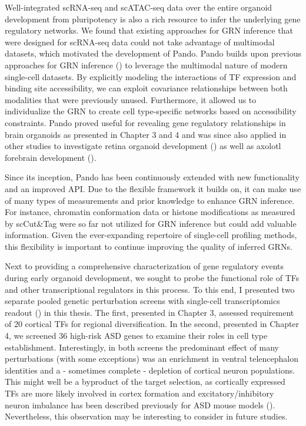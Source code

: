 Well-integrated scRNA-seq and scATAC-seq data over the entire organoid development from pluripotency is also a rich resource to infer the underlying gene regulatory networks. We found that existing approaches for GRN inference that were designed for scRNA-seq data could not take advantage of multimodal datasets, which motivated the development of Pando. Pando builds upon previous approaches for GRN inference (\cite{aibar_scenic_2017}) to leverage the multimodal nature of modern single-cell datasets. By explicitly modeling the interactions of TF expression and binding site accessibility, we can exploit covariance relationships between both modalities that were previously unused. Furthermore, it allowed us to individualize the GRN to create cell type-specific networks based on accessibility constraints. Pando proved useful for revealing gene regulatory relationships in brain organoids as presented in Chapter 3 and 4 and was since also applied in other studies to investigate retina organoid development (\cite{wahle_multimodal_2022}) as well as axolotl forebrain development (\cite{lust_single-cell_2022}).

Since its inception, Pando has been continuously extended with new functionality and an improved API. Due to the flexible framework it builds on, it can make use of many types of measurements and prior knowledge to enhance GRN inference. For instance, chromatin conformation data or histone modifications as measured by scCut\&Tag were so far not utilized for GRN inference but could add valuable information. Given the ever-expanding repertoire of single-cell profiling methods, this flexibility is important to continue improving the quality of inferred GRNs.


Next to providing a comprehensive characterization of gene regulatory events during early organoid development, we sought to probe the functional role of TFs and other transcriptional regulators in this process. To this end, I presented two separate pooled genetic perturbation screens with single-cell transcriptomics readout (\cite{datlinger_pooled_2017}) in this thesis. The first, presented in Chapter 3, assessed requirement of 20 cortical TFs for regional diversification. In the second, presented in Chapter 4, we screened 36 high-risk ASD genes to examine their roles in cell type establishment. Interestingly, in both screens the predominant effect of many perturbations (with some exceptions) was an enrichment in ventral telencephalon identities and a - sometimes complete - depletion of cortical neuron populations. This might well be a byproduct of the target selection, as cortically expressed TFs are more likely involved in cortex formation and excitatory/inhibitory neuron imbalance has been described previously for ASD mouse models (\cite{sudhof_neuroligins_2008,nelson_excitatoryinhibitory_2015}). Nevertheless, this observation may be interesting to consider in future studies.

